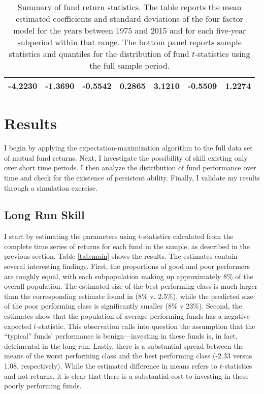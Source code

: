 \begin{table}[p]
\begin{tabular}{*{7}{c}}
		\midrule
		-4.2230 & -1.3690 & -0.5542 & 0.2865 & 3.1210 & -0.5509 & 1.2274 \\
		\bottomrule
		\end{tabular}
		\captionsetup{position=below, font=footnotesize, justification=justified, width=0.83\linewidth}
		\caption[Summary of fund return statistics]{Summary of fund return statistics. The table reports the mean estimated coefficients and standard deviations of the \citet{Carhart1997} four factor model for the years between 1975 and 2015 and for each five-year subperiod within that range. The bottom panel reports sample statistics and quantiles for the distribution of fund $t$-statistics using the full sample period.}
		\label{tab:summary}
	\end{table}


\section{Results}
	I begin by applying the expectation-maximization algorithm to the full data set of mutual fund returns. Next, I investigate the possibility of skill existing only over short time periods. I then analyze the distribution of fund performance over time and check for the existence of persistent ability. Finally, I validate my results through a simulation exercise.

	\subsection{Long Run Skill}
		I start by estimating the parameters using $t$-statistics calculated from the complete time series of returns for each fund in the sample, as described in the previous section. Table \ref{tab:main} shows the results. The estimates contain several interesting findings.  First, the proportions of good and poor performers are roughly equal, with each subpopulation making up approximately 8\% of the overall population.  The estimated size of the best performing class is much larger than the corresponding estimate found in \citet{Barras2010} (8\% v. 2.5\%), while the predicted size of the poor performing class is significantly smaller (8\% v 23\%). Second, the estimates show that the population of average performing funds has a negative expected $t$-statistic.  This observation calls into question the assumption that the ``typical'' funds' performance is benign---investing in these funds is, in fact, detrimental in the long-run.  Lastly, there is a substantial spread between the means of the worst performing class and the best performing class (-2.33 versus 1.08, respectively). While the estimated difference in means refers to $t$-statistics and not returns, it is clear that there is a substantial cost to investing in these poorly performing funds.

